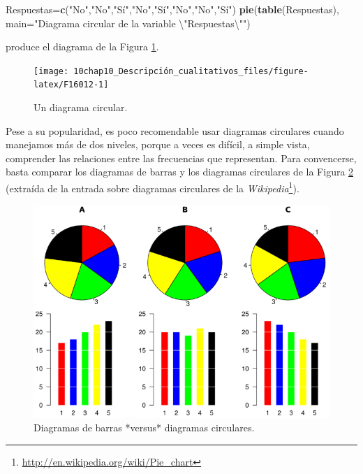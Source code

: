 \documentclass[
]{book}
\newenvironment{Shaded}{\begin{snugshade}}{\end{snugshade}}
\newcommand{\CharTok}[1]{\textcolor[rgb]{0.31,0.60,0.02}{#1}}
\newcommand{\DataTypeTok}[1]{\textcolor[rgb]{0.13,0.29,0.53}{#1}}
\newcommand{\KeywordTok}[1]{\textcolor[rgb]{0.13,0.29,0.53}{\textbf{#1}}}
\newcommand{\NormalTok}[1]{#1}
\newcommand{\StringTok}[1]{\textcolor[rgb]{0.31,0.60,0.02}{#1}}
\DeclareRobustCommand{\href}[2]{#2\footnote{\url{#1}}}
\theoremstyle{definition}
\theoremstyle{definition}
\theoremstyle{definition}
\theoremstyle{remark}
\begin{document}
\begin{Shaded}
\begin{Highlighting}[]
\NormalTok{Respuestas=}\KeywordTok{c}\NormalTok{(}\StringTok{"No"}\NormalTok{,}\StringTok{"No"}\NormalTok{,}\StringTok{"Sí"}\NormalTok{,}\StringTok{"No"}\NormalTok{,}\StringTok{"Sí"}\NormalTok{,}\StringTok{"No"}\NormalTok{,}\StringTok{"No"}\NormalTok{,}\StringTok{"Sí"}\NormalTok{)}
\KeywordTok{pie}\NormalTok{(}\KeywordTok{table}\NormalTok{(Respuestas), }\DataTypeTok{main=}\StringTok{"Diagrama circular de la variable }\CharTok{\textbackslash{}"}\StringTok{Respuestas}\CharTok{\textbackslash{}"}\StringTok{"}\NormalTok{)}
\end{Highlighting}
\end{Shaded}

produce el diagrama de la Figura \ref{fig:F16012}.

\begin{figure}

{\centering \texttt{[image: 10chap10\_Descripción\_cualitativos\_files/figure-latex/F16012-1]} 

}

\caption{Un diagrama circular.}\label{fig:F16012}
\end{figure}

Pese a su popularidad, es poco recomendable usar diagramas circulares cuando manejamos más de dos niveles, porque a veces es difícil, a simple vista, comprender las relaciones entre las frecuencias que representan. Para convencerse, basta comparar los diagramas de barras y los diagramas circulares de la Figura \ref{fig:wiki} (extraída de la
\href{http://en.wikipedia.org/wiki/Pie_chart}{entrada sobre diagramas circulares de la \emph{Wikipedia}}).

\begin{figure}

{\centering \includegraphics[width=0.9\linewidth]{AprendeR-Parte-I_files/figure-html/wikipc} 

}

\caption{Diagramas de barras *versus* diagramas circulares.}\label{fig:wiki}
\end{figure}
\end{document}

